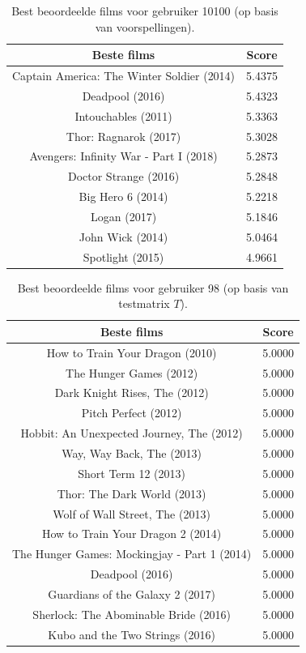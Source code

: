 \begin{table}[H]
\centering
\begin{tabular}{c|c}
\textbf{Beste films} & \textbf{Score} \\
\hline
    Captain America: The Winter Soldier (2014) & 5.4375 \\
    Deadpool (2016)                            & 5.4323 \\
    Intouchables (2011)                        & 5.3363 \\
    Thor: Ragnarok (2017)                      & 5.3028 \\
    Avengers: Infinity War - Part I (2018)     & 5.2873 \\
    Doctor Strange (2016)                      & 5.2848 \\
    Big Hero 6 (2014)                          & 5.2218 \\
    Logan (2017)                               & 5.1846 \\
    John Wick (2014)                           & 5.0464 \\
    Spotlight (2015)                           & 4.9661 
\end{tabular}
\caption{Best beoordeelde films voor gebruiker 10100 (op basis van voorspellingen).}
\label{fig:op18b}
\end{table}

\begin{table}[H]
\centering
\begin{tabular}{c|c}
\textbf{Beste films} & \textbf{Score} \\
\hline
How to Train Your Dragon (2010)             & 5.0000 \\
The Hunger Games (2012)                     & 5.0000 \\
Dark Knight Rises, The (2012)               & 5.0000 \\
Pitch Perfect (2012)                        & 5.0000 \\
Hobbit: An Unexpected Journey, The (2012)   & 5.0000 \\
Way, Way Back, The (2013)                   & 5.0000 \\
Short Term 12 (2013)                        & 5.0000 \\
Thor: The Dark World (2013)                 & 5.0000 \\
Wolf of Wall Street, The (2013)             & 5.0000 \\
How to Train Your Dragon 2 (2014)           & 5.0000 \\
The Hunger Games: Mockingjay - Part 1 (2014)& 5.0000 \\
Deadpool (2016)                             & 5.0000 \\
Guardians of the Galaxy 2 (2017)            & 5.0000 \\
Sherlock: The Abominable Bride (2016)       & 5.0000 \\
Kubo and the Two Strings (2016)             & 5.0000
\end{tabular}
\caption{Best beoordeelde films voor gebruiker 98 (op basis van testmatrix $T$).}
\label{fig:op18c}
\end{table}

